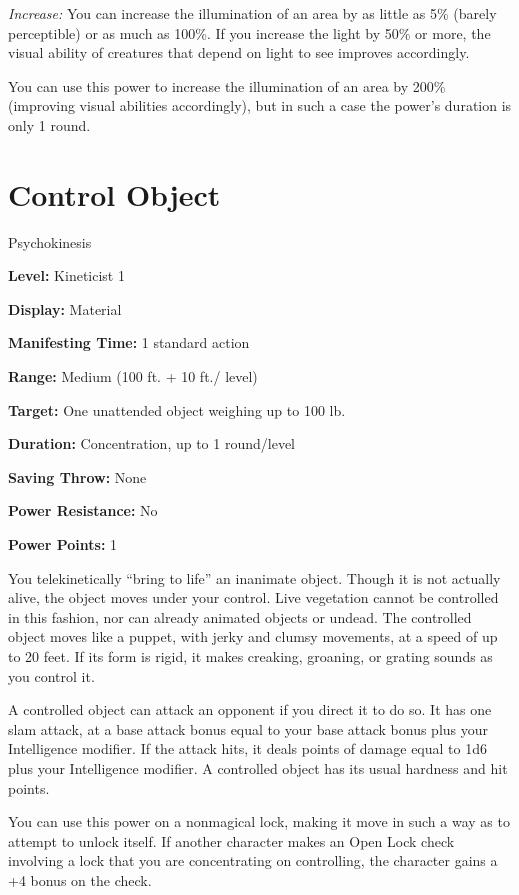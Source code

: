 \documentclass{article}
\begin{document}
\textit{Increase: }You can increase the illumination of an area by as little as 
5\% (barely perceptible) or as much as 100\%. If you increase the light by 50\% 
or more, the visual ability of creatures that depend on light to see improves accordingly.

You can use this power to increase the illumination of an area by 200\%  (improving 
visual abilities accordingly), but in such a case the power's duration is only 
1 round.

\vspace{12pt}
\section*{Control Object}

Psychokinesis

\textbf{Level:} Kineticist 1

\textbf{Display:} Material

\textbf{Manifesting Time:} 1 standard action

\textbf{Range:} Medium (100 ft. + 10 ft./ level)

\textbf{Target:} One unattended object weighing up to 100 lb.

\textbf{Duration:} Concentration, up to 1 round/level

\textbf{Saving Throw:} None

\textbf{Power Resistance:} No

\textbf{Power Points:} 1

You telekinetically ``bring to life'' an inanimate object. Though it is not actually 
alive, the object moves under your control. Live vegetation cannot be controlled 
in this fashion, nor can already animated objects or undead. The controlled object 
moves like a puppet, with jerky and clumsy movements, at a speed of up to 20 feet. 
If its form is rigid, it makes creaking, groaning, or grating sounds as you control 
it.

A controlled object can attack an opponent if you direct it to do so. It has one 
slam attack, at a base attack bonus equal to your base attack bonus plus your Intelligence 
modifier. If the attack hits, it deals points of damage equal to 1d6 plus your 
Intelligence modifier. A controlled object has its usual hardness and hit points.

You can use this power on a nonmagical lock, making it move in such a way as to 
attempt to unlock itself. If another character makes an Open Lock check involving 
a lock that you are concentrating on controlling, the character gains a +4 bonus 
on the check.
\end{document}
